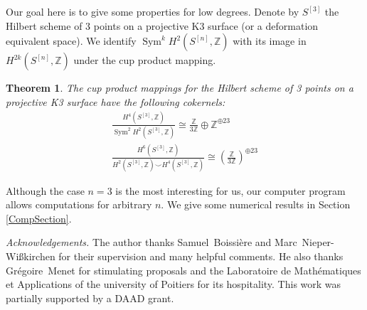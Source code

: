 \documentclass{amsart}
\DeclareMathOperator{\Sym}{Sym}
\newcommand{\hilb}[1]{^{[#1]}}
\newcommand{\IZ}{\mathbb{Z}}
\theoremstyle{plain}
\newtheorem{theorem}{Theorem}[section]
\theoremstyle{definition}
\theoremstyle{remark}
\begin{document}
Our goal here is to give some properties for low degrees.
Denote by $S\hilb{3}$ the Hilbert scheme of 3 points on a projective K3 surface (or a deformation equivalent space). We identify $\Sym^kH^2(S\hilb{n},\IZ)$ with its image in $H^{2k}(S\hilb{n},\IZ)$ under the cup product mapping. 
\begin{theorem}
The cup product mappings for the Hilbert scheme of 3 points on a projective K3 surface have the following cokernels:
\begin{gather}
\frac{H^4(S\hilb{3},\IZ)}{\Sym^2 H^2(S\hilb{3},\IZ)}  \cong \frac{\IZ}{3\IZ} \oplus \IZ^ {\oplus 23}\\
\frac{H^6(S\hilb{3},\IZ)}{H^2(S\hilb{3},\IZ)\smile H^4(S\hilb{3},\IZ)} \cong \left(\frac{\IZ}{3\IZ}\right)^{\oplus 23}
\end{gather}
\end{theorem}
Although the case $n=3$ is the most interesting for us, our computer program allows computations for arbitrary $n$. We give some numerical results in Section \ref{CompSection}.\vspace{5pt}

\emph{Acknowledgements.} The author thanks Samuel~Boissi\`ere and Marc~Nieper-Wi{\ss}kirchen for their supervision and many helpful comments. He also thanks Gr\'{e}goire~Menet for stimulating proposals and the Laboratoire de Math\'{e}matiques et Applications of the university of Poitiers for its hospitality. This work was partially supported by a DAAD grant.
\end{document}

